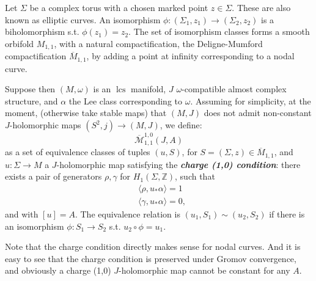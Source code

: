 \documentclass{amsart}
\numberwithin{equation}{section}
\newtheorem{definition}[equation]{Definition}
\theoremstyle{definition}
\theoremstyle{remark}
\DeclareMathOperator{\lcs}{lcs}
\begin{document}
Let $\Sigma$ be a complex torus with a chosen marked point $z  \in \Sigma $. These are also known as elliptic curves.  An isomorphism $\phi: (\Sigma _{1}, z _{1} ) \to (\Sigma _{2}, z _{2} )$ is a biholomorphism s.t. $\phi (z _{1} ) = z _{2} $. The set of isomorphism classes forms a smooth orbifold $M _{1,1} $, with a natural compactification, the Deligne-Mumford compactification $\overline{M} _{1,1}  $, by adding a point at infinity corresponding to a nodal curve. 

Suppose then $(M,\omega)$ is an $\lcs$ manifold, $J$ $\omega$-compatible almost complex structure, and $\alpha$ the Lee class corresponding to $\omega$. Assuming for simplicity, at the moment, (otherwise take stable maps) that $(M,J)$ does not admit non-constant $J$-holomorphic maps $(S ^{2},j) \to (M,J)$,  we define: $$\overline{\mathcal{M}} ^{1,0} _{1,1}  (J, A )$$ as a set of equivalence classes of tuples $(u, S)$, for $S= (\Sigma, z) \in \overline {M} _{1,1} $, and $u: \Sigma \to M$ a $J$-holomorphic map satisfying the \textbf{\emph{charge (1,0) condition}}: 
there exists a pair of generators $\rho, \gamma$ for $H _{1} (\Sigma, \mathbb{Z}) $, 
such that 
\begin{align*}
& \langle \rho, u _{*} \alpha \rangle =1 \\
& \langle \gamma, u _{*} \alpha \rangle =0,
\end{align*}
and with $[u]=A$. The equivalence relation is $(u _{1}, S _{1}  ) \sim (u _{2}, S _{2}  )$ if there is an isomorphism $\phi: S _{1} \to S _{2}  $ s.t. $u _{2} \circ \phi = u _{1} $.

Note that the charge condition directly makes  sense for nodal curves. 
And it is easy to see that the charge condition is preserved under Gromov convergence, and obviously a charge (1,0) $J$-holomorphic map cannot be constant for any $A$.
\end{document}

